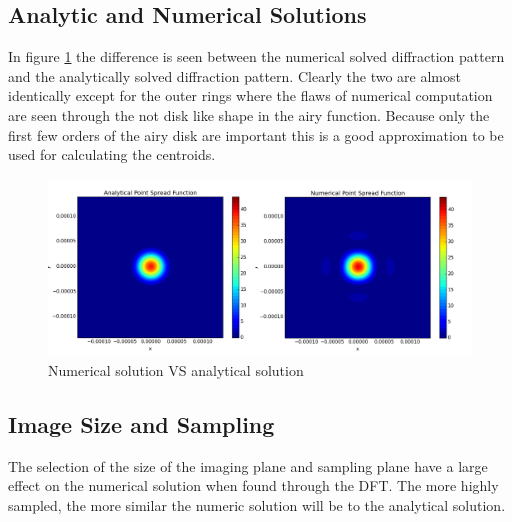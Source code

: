 \subsection{Analytic and Numerical Solutions}
In figure \ref{fig:num_vs_an} the difference is seen between the numerical solved diffraction pattern and the analytically solved diffraction pattern. Clearly the two are almost identically except for the outer rings where the flaws of numerical computation are seen through the not disk like shape in the airy function. Because only the first few orders of the airy disk are important this is a good approximation to be used for calculating the centroids. 
\begin{figure}[H]
	\centering
		\includegraphics[width=1.0\textwidth]{figures/num_vs_an.png}
	\caption{Numerical solution VS analytical solution}
	\label{fig:num_vs_an}
\end{figure}

\subsection{Image Size and Sampling}
The selection of the size of the imaging plane and sampling plane have a large effect on the numerical solution when found through the DFT.  The more highly sampled, the more similar the numeric solution will be to the analytical solution.  


